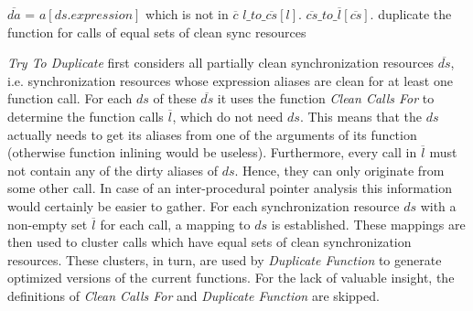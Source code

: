 \begin{algorithmic}
\State {}
 
  \State $\overline{da}$ = $a[ds.\mathit{expression}]$ which is not in $\overline{c}$ 
   
    \State $l\_to\_\overline{cs}[l]$. 
  \EndFor
\EndFor
{} 
  \State $\overline{cs}\_to\_\overline{l}[\overline{cs}]$.
\EndFor
{} \Comment duplicate the function for calls of equal sets of clean sync resources
  \State {}
\EndFor
\EndFunction
\end{algorithmic}
\textit{Try To Duplicate} first considers all partially clean synchronization resources $\overline{ds}$, i.e. synchronization resources whose expression aliases are clean for at least one function call. For each $ds$ of these $\overline{ds}$ it uses the function \textit{Clean Calls For} to determine the function calls $\overline{l}$, which do not need $ds$. This means that the $ds$ actually needs to get its aliases from one of the arguments of its function (otherwise function inlining would be useless). Furthermore, every call in $\overline{l}$ must not contain any of the dirty aliases of $ds$. Hence, they can only originate from some other call. In case of an inter-procedural pointer analysis this information would certainly be easier to gather. For each synchronization resource $ds$ with a non-empty set $\overline{l}$ for each call, a mapping to $ds$ is established. These mappings are then used to cluster calls which have equal sets of clean synchronization resources. These clusters, in turn, are used by \textit{Duplicate Function} to generate optimized versions of the current functions. For the lack of valuable insight, the definitions of \textit{Clean Calls For} and \textit{Duplicate Function} are skipped.

